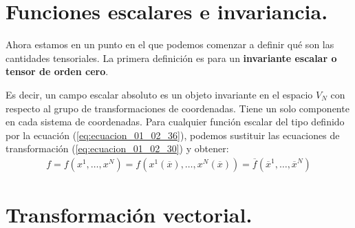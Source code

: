 \documentclass[hidelinks,12pt]{article}
\begin{document}
\section{Funciones escalares e invariancia.}

Ahora estamos en un punto en el que podemos comenzar a definir qué son las cantidades tensoriales. La primera definición es para un \textbf{invariante escalar o tensor de orden cero}.

\begin{center}
\noindent{}
\end{center}
\par
Es decir, un campo escalar absoluto es un objeto invariante en el espacio $V_{N}$ con respecto al grupo de transformaciones de coordenadas. Tiene un solo componente en cada sistema de coordenadas. Para cualquier función escalar del tipo definido por la ecuación (\ref{eq:ecuacion_01_02_36}), podemos sustituir las ecuaciones de transformación (\ref{eq:ecuacion_01_02_30}) y obtener:
\begin{align}
f = f (x^{1}, \ldots, x^{N}) = f (x^{1} (\overline{x}), \ldots, x^{N} (\overline{x})) = \overline{f} (\overline{x}^{1}, \ldots, \overline{x}^{N})
\label{eq:ecuacion_01_02_38}
\end{align}

\section{Transformación vectorial.}
\end{document}
